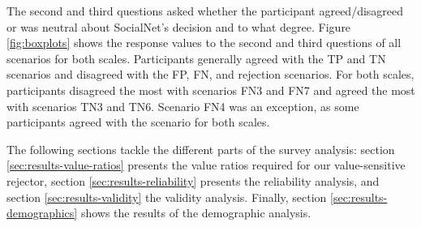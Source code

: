 %
The second and third questions asked whether the participant agreed/disagreed or was neutral about SocialNet's decision and to what degree.
%
Figure \ref{fig:boxplots} shows the response values to the second and third questions of all scenarios for both scales.
%
Participants generally agreed with the TP and TN scenarios and disagreed with the FP, FN, and rejection scenarios.
%
For both scales, participants disagreed the most with scenarios FN3 and FN7 and agreed the most with scenarios TN3 and TN6.
%
Scenario FN4 was an exception, as some participants agreed with the scenario for both scales.
%

%
The following sections tackle the different parts of the survey analysis: section \ref{sec:results-value-ratios} presents the value ratios required for our value-sensitive rejector, section \ref{sec:results-reliability} presents the reliability analysis, and section \ref{sec:results-validity} the validity analysis.
%
Finally, section \ref{sec:results-demographics} shows the results of the demographic analysis.
%

